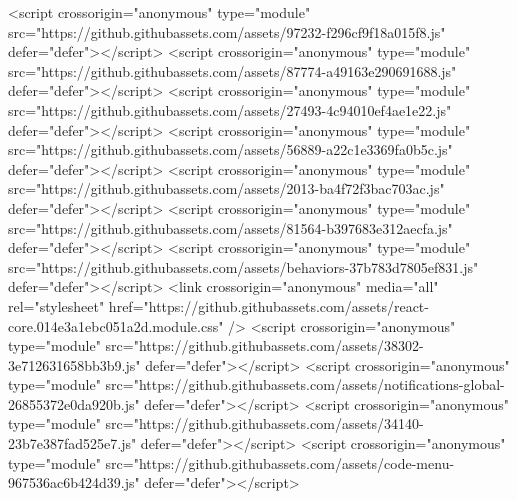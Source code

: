 <script crossorigin="anonymous" type="module" src="https://github.githubassets.com/assets/97232-f296cf9f18a015f8.js" defer="defer"></script>
<script crossorigin="anonymous" type="module" src="https://github.githubassets.com/assets/87774-a49163e290691688.js" defer="defer"></script>
<script crossorigin="anonymous" type="module" src="https://github.githubassets.com/assets/27493-4c94010ef4ae1e22.js" defer="defer"></script>
<script crossorigin="anonymous" type="module" src="https://github.githubassets.com/assets/56889-a22c1e3369fa0b5c.js" defer="defer"></script>
<script crossorigin="anonymous" type="module" src="https://github.githubassets.com/assets/2013-ba4f72f3bac703ac.js" defer="defer"></script>
<script crossorigin="anonymous" type="module" src="https://github.githubassets.com/assets/81564-b397683e312aecfa.js" defer="defer"></script>
<script crossorigin="anonymous" type="module" src="https://github.githubassets.com/assets/behaviors-37b783d7805ef831.js" defer="defer"></script>
<link crossorigin="anonymous" media="all" rel="stylesheet" href="https://github.githubassets.com/assets/react-core.014e3a1ebc051a2d.module.css" />
<script crossorigin="anonymous" type="module" src="https://github.githubassets.com/assets/38302-3e712631658bb3b9.js" defer="defer"></script>
<script crossorigin="anonymous" type="module" src="https://github.githubassets.com/assets/notifications-global-26855372e0da920b.js" defer="defer"></script>
<script crossorigin="anonymous" type="module" src="https://github.githubassets.com/assets/34140-23b7e387fad525e7.js" defer="defer"></script>
<script crossorigin="anonymous" type="module" src="https://github.githubassets.com/assets/code-menu-967536ac6b424d39.js" defer="defer"></script>
  
